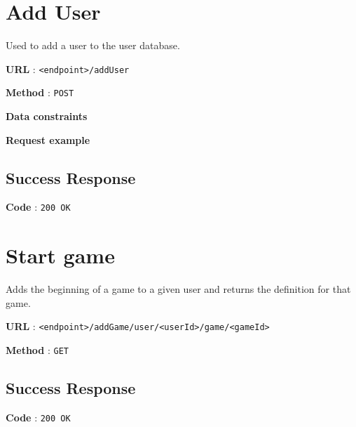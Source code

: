 \section{Add User}\label{add-user}

Used to add a user to the user database.

\textbf{URL} : \texttt{\textless{}endpoint\textgreater{}/addUser}

\textbf{Method} : \texttt{POST}

\textbf{Data constraints}

\begin{Shaded}
\begin{Highlighting}[]
\NormalTok{\{}
  \NormalTok{: }
\NormalTok{\}}
\end{Highlighting}
\end{Shaded}

\textbf{Request example}

\begin{Shaded}
\begin{Highlighting}[]
\NormalTok{\{}
  \NormalTok{: }
\NormalTok{\}}
\end{Highlighting}
\end{Shaded}

\subsection{Success Response}\label{success-response}

\textbf{Code} : \texttt{200 OK}

\section{Start game}\label{start-game}

Adds the beginning of a game to a given user and returns the definition
for that game.

\textbf{URL} :
\texttt{\textless{}endpoint\textgreater{}/addGame/user/\textless{}userId\textgreater{}/game/\textless{}gameId\textgreater{}}

\textbf{Method} : \texttt{GET}

\subsection{Success Response}\label{success-response-1}

\textbf{Code} : \texttt{200 OK}

